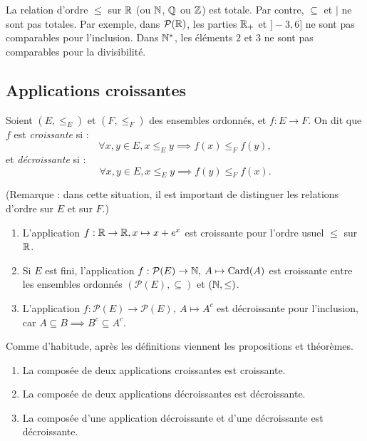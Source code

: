 \begin{exemples}
La relation d'ordre $\leq$ sur $\mathbb{R}$ (ou $\mathbb{N}$, $\mathbb{Q}$ ou  $\mathbb{Z}$) est totale. Par contre, $\subseteq$ et $|$ ne sont pas totales. Par exemple, dans $\mathcal P(\mathbb{R})$, les parties $\mathbb{R}_+$ et $]-3,6]$ ne sont pas comparables pour l'inclusion. Dans $\mathbb{N}^*$, les éléments $2$ et $3$ ne sont pas comparables pour la divisibilité.
\end{exemples}

\subsection{Applications croissantes}


\begin{definition}
Soient $(E,\leq_E)$ et $(F,\leq_F)$ des ensembles ordonnés, et $f : E\to F$. On dit que $f$ est \emph{croissante} si :
\[ \forall x, y\in E, x\leq_E y \implies f(x) \leq_F f(y),\]
et \emph{décroissante} si :
\[\forall x, y\in E, x\leq_E y \implies f(y) \leq_F f(x).\]
\end{definition}

(Remarque : dans cette situation, il est important de distinguer les relations d'ordre sur $E$ et sur $F$.)

\begin{exemple}
\begin{enumerate}
\item L'application $f : \mathbb{R}\to \mathbb{R}, x\mapsto x+e^x$ est croissante pour l'ordre usuel $\leq $ sur $\mathbb{R}$.
\item Si $E$ est fini, l'application $f : \mathcal P(E) \to \mathbb{N}, \: A\mapsto \operatorname{Card}(A)$ est croissante entre les ensembles ordonnés $(\mathcal P(E), \subseteq)$ et $(\mathbb{N}, \leq)$.
\item L'application $f : \mathcal P(E) \to \mathcal P(E), \: A\mapsto A^c$ est décroissante pour l'inclusion, car $A\subseteq B \implies B^c\subseteq A^c$.
\end{enumerate}
\end{exemple}

Comme d'habitude, après les définitions viennent les propositions et théorèmes.

\begin{proposition}
\begin{enumerate}
\item La composée de deux applications croissantes est croissante.
\item La composée de deux applications décroissantes est décroissante.
\item La composée d'une application décroissante et d'une décroissante est décroissante.
\end{enumerate}
\end{proposition}

